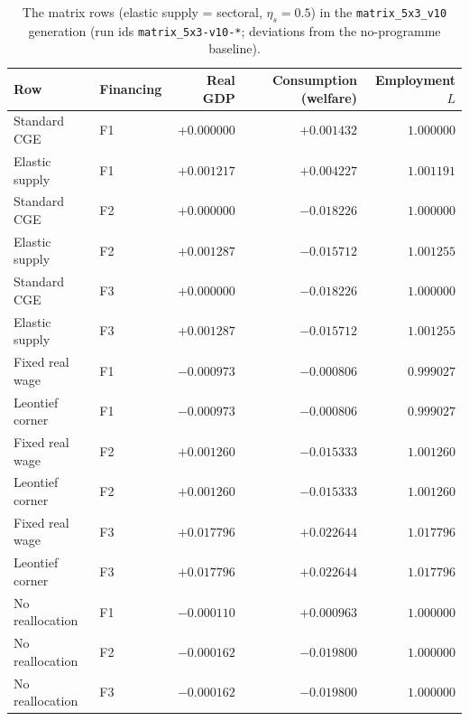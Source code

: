\begin{table}[htbp]
\centering
\caption{The matrix rows (elastic supply = sectoral, $\eta_s=0.5$) in the
\texttt{matrix\_5x3\_v10} generation
(run ids \texttt{matrix\_5x3-v10-*}; deviations from the no-programme
baseline).}
\label{tab:matrix}
\begin{tabular}{llrrr}
\toprule
Row & Financing & Real GDP & Consumption (welfare) & Employment $L$ \\
\midrule
Standard CGE & F1 & $+0.000000$ & $+0.001432$ & $1.000000$ \\
Elastic supply  & F1 & $+0.001217$ & $+0.004227$ & $1.001191$ \\
Standard CGE & F2 & $+0.000000$ & $-0.018226$ & $1.000000$ \\
Elastic supply  & F2 & $+0.001287$ & $-0.015712$ & $1.001255$ \\
Standard CGE & F3 & $+0.000000$ & $-0.018226$ & $1.000000$ \\
Elastic supply  & F3 & $+0.001287$ & $-0.015712$ & $1.001255$ \\
\midrule
Fixed real wage & F1 & $-0.000973$ & $-0.000806$ & $0.999027$ \\
Leontief corner & F1 & $-0.000973$ & $-0.000806$ & $0.999027$ \\
Fixed real wage & F2 & $+0.001260$ & $-0.015333$ & $1.001260$ \\
Leontief corner & F2 & $+0.001260$ & $-0.015333$ & $1.001260$ \\
Fixed real wage & F3 & $+0.017796$ & $+0.022644$ & $1.017796$ \\
Leontief corner & F3 & $+0.017796$ & $+0.022644$ & $1.017796$ \\
\midrule
No reallocation & F1 & $-0.000110$ & $+0.000963$ & $1.000000$ \\
No reallocation & F2 & $-0.000162$ & $-0.019800$ & $1.000000$ \\
No reallocation & F3 & $-0.000162$ & $-0.019800$ & $1.000000$ \\
\bottomrule
\end{tabular}
\end{table}

